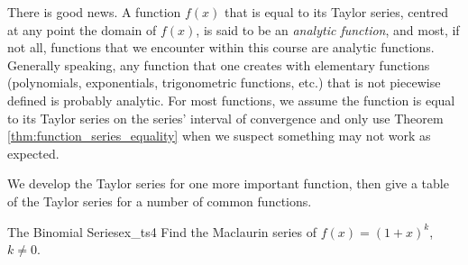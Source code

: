 There is good news. A function $f(x)$ that is equal to its Taylor series, centred at any point the domain of $f(x)$, is said to be an \textit{analytic function}, and most, if not all, functions that we encounter within this course are analytic functions. Generally speaking, any function that one creates with elementary functions (polynomials, exponentials, trigonometric functions, etc.) that is not piecewise defined is probably analytic. For most functions, we assume the function is equal to its Taylor series on the series' interval of convergence and only use Theorem \ref{thm:function_series_equality} when we suspect something may not work as expected.

We develop the Taylor series for one more important function, then give a table of the Taylor series for a number of common functions.\\

\begin{example}{The Binomial Series}{ex_ts4}
{Find the Maclaurin series of $f(x) = (1+x)^k$, $k\neq 0$.
}
\end{example}


